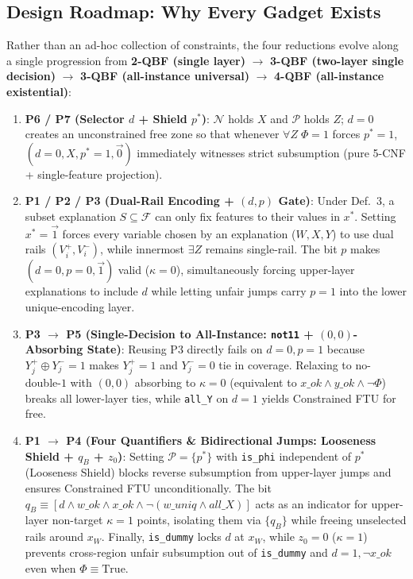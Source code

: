 \documentclass[11pt,a4paper]{article}
\newcommand{\N}{\mathcal{N}}
\newcommand{\Prot}{\mathcal{P}}
\newcommand{\code}[1]{\texttt{\small #1}}
\begin{document}
\subsection{Design Roadmap: Why Every Gadget Exists}
Rather than an ad-hoc collection of constraints, the four reductions evolve along a single progression from \textbf{2-QBF (single layer)} $\to$ \textbf{3-QBF (two-layer single decision)} $\to$ \textbf{3-QBF (all-instance universal)} $\to$ \textbf{4-QBF (all-instance existential)}:
\begin{enumerate}
  \item \textbf{P6 / P7 (Selector $d$ + Shield $p^*$)}: $\N$ holds $X$ and $\Prot$ holds $Z$; $d=0$ creates an unconstrained free zone so that whenever $\forall Z\;\Phi=1$ forces $p^*=1$, $(d=0, X, p^*=1, \vec{0})$ immediately witnesses strict subsumption (pure 5-CNF + single-feature projection).
  \item \textbf{P1 / P2 / P3 (Dual-Rail Encoding + $(d,p)$ Gate)}: Under Def.~3, a subset explanation $S \subseteq \mathcal{F}$ can only fix features to their values in $x^*$. Setting $x^*=\vec{1}$ forces every variable chosen by an explanation ($W,X,Y$) to use dual rails $(V_i^+,V_i^-)$, while innermost $\exists Z$ remains single-rail. The bit $p$ makes $(d=0,p=0,\vec{1})$ valid ($\kappa=0$), simultaneously forcing upper-layer explanations to include $d$ while letting unfair jumps carry $p=1$ into the lower unique-encoding layer.
  \item \textbf{P3 $\to$ P5 (Single-Decision to All-Instance: \code{not11} + $(0,0)$-Absorbing State)}: Reusing P3 directly fails on $d=0,p=1$ because $Y_j^+ \oplus Y_j^-=1$ makes $Y_j^+=1$ and $Y_j^-=0$ tie in coverage. Relaxing to no-double-$1$ with $(0,0)$ absorbing to $\kappa=0$ (equivalent to $x\_ok \land y\_ok \land \neg\Phi$) breaks all lower-layer ties, while \code{all\_Y} on $d=1$ yields Constrained FTU for free.
  \item \textbf{P1 $\to$ P4 (Four Quantifiers \& Bidirectional Jumps: Looseness Shield + $q_B$ + $z_0$)}: Setting $\Prot=\{p^*\}$ with \code{is\_phi} independent of $p^*$ (Looseness Shield) blocks reverse subsumption from upper-layer jumps and ensures Constrained FTU unconditionally. The bit $q_B \equiv [d \land w\_ok \land x\_ok \land \neg(w\_uniq \land all\_X)]$ acts as an indicator for upper-layer non-target $\kappa=1$ points, isolating them via $\{q_B\}$ while freeing unselected rails around $x_W$. Finally, \code{is\_dummy} locks $d$ at $x_W$, while $z_0=0$ ($\kappa=1$) prevents cross-region unfair subsumption out of \code{is\_dummy} and $d=1,\neg x\_ok$ even when $\Phi \equiv \mathrm{True}$.
\end{enumerate}
\end{document}
